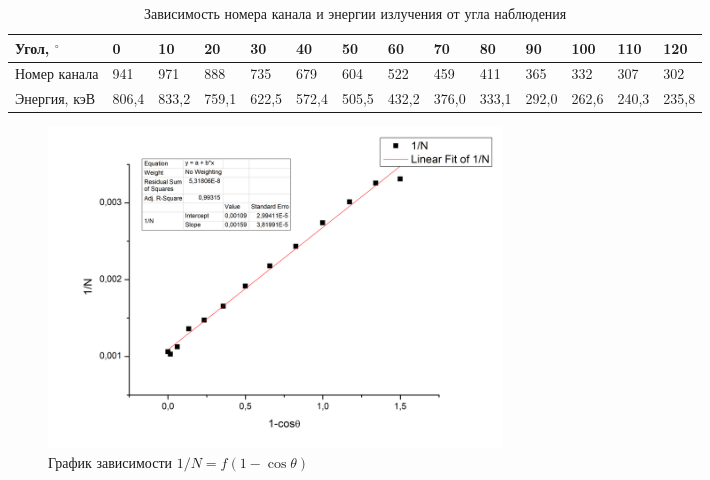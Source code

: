 \documentclass[a4paper]{article}
\begin{document}
\begin{enumerate}
        \begin{table}[h]
    \centering
    \begin{center}
    \caption{Зависимость номера канала и энергии излучения от угла наблюдения}
    \end{center}
    \vspace{0.1cm}
    \label{tab:my_label}
    \begin{tabular}{|p{1.5cm}||p{0.8cm}|p{0.8cm}|p{0.8cm}|p{0.8cm}|p{0.8cm}|p{0.8cm}|p{0.8cm}|p{0.8cm}|p{0.8cm}|p{0.8cm}|p{0.8cm}|p{0.8cm}|p{0.8cm}|}
\hline
  Угол, $^{\circ}$ & 0 & 10 & 20 & 30 & 40 & 50 & 60 & 70 & 80 & 90  & 100 & 110 & 120 \\
 \hline 
 Номер канала & 941 & 971 & 888 & 735 & 679 & 604 & 522 & 459 & 411 & 365 & 332 & 307 & 302 \\
\hline 
Энергия, кэВ & 806,4 & 833,2 & 759,1 & 622,5 & 572,4 & 505,5 & 432,2 & 376,0 & 333,1 & 292,0 & 262,6 & 240,3 & 235,8
 \\

\hline
 \end{tabular}
\end{table} 
\end{enumerate}

    \begin{figure}[h]
\begin{center}
\includegraphics[width=12cm]{N.png}
\caption{График зависимости $1/N = f(1-\cos \theta)$}
\label{ris:experimoriginal} %
\end{center}
\end{figure}
\end{document}
